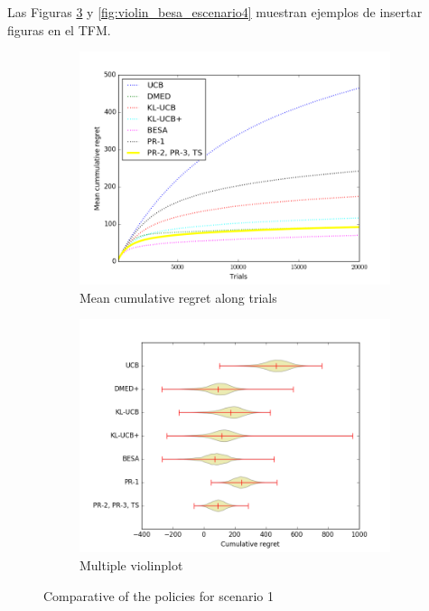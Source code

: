 {{		Las Figuras \ref{fig:Bernoulli1} y \ref{fig:violin_besa_escenario4} muestran ejemplos de  insertar figuras en el TFM.
		\begin{figure}[htb]
			\centering
			\begin{subfigure}{0.5\textwidth}
				\includegraphics[width=\textwidth]{recursos/Figure1a}
				\caption{Mean cumulative regret along trials}
				\label{fig:Bernoulli1_semilog}
			\end{subfigure}
			\begin{subfigure}{0.5\textwidth}
				\includegraphics[width=\textwidth]{recursos/Figure1b}
				\caption{Multiple violinplot}
				\label{fig:Bernoulli1_boxplot}
			\end{subfigure}
			\caption{Comparative of the policies for scenario 1}
			\label{fig:Bernoulli1}
		\end{figure}
		
}}
